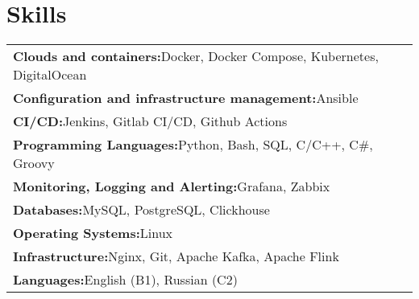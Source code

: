 \documentclass[a4paper,12pt]{article}
\begin{document}
    \section{Skills}
    \renewcommand{\arraystretch}{1.2}
    \begin{tabularx}{\linewidth}{@{}l X@{}}
        \textbf{Clouds and containers:}\quad Docker, \quad Docker Compose, \quad Kubernetes, \quad DigitalOcean \\
        \textbf{Configuration and infrastructure management:}\quad Ansible \\
        \textbf{CI/CD:}\quad Jenkins, \quad Gitlab CI/CD, \quad Github Actions \\
        \textbf{Programming Languages:}\quad Python, \quad Bash, \quad SQL, \quad C/C++, \quad C\#, \quad Groovy \\
        \textbf{Monitoring, Logging and Alerting:}\quad Grafana, \quad Zabbix \\
        \textbf{Databases:}\quad MySQL, \quad PostgreSQL, \quad Clickhouse \\
        \textbf{Operating Systems:}\quad Linux \\
        \textbf{Infrastructure:}\quad Nginx, \quad Git, \quad Apache Kafka, \quad Apache Flink \\
        \textbf{Languages:}\quad English (B1), \quad Russian (C2) \\
    \end{tabularx}
\end{document}
